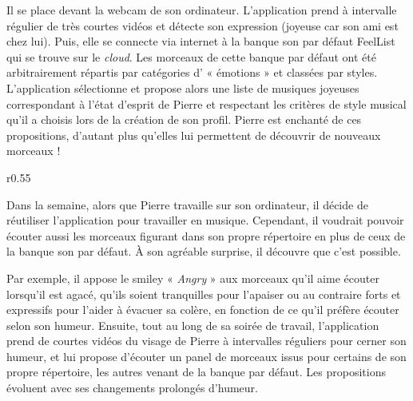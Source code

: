 Il se place devant la webcam de son ordinateur.
L’application prend à intervalle régulier de très courtes vidéos et détecte son expression (joyeuse car son ami est chez lui).
Puis, elle se connecte via internet à la banque son par défaut FeelList qui se trouve sur le \textit{cloud}.
Les morceaux de cette banque par défaut ont été arbitrairement répartis par catégories d' « émotions »  et classées par styles.
L'application sélectionne et propose alors une liste de musiques joyeuses correspondant à l'état d'esprit de Pierre et respectant les critères de style musical qu'il a choisis lors de la création de son profil.
Pierre est enchanté de ces propositions, d'autant plus qu'elles lui permettent de découvrir de nouveaux morceaux !\\

\begin{wrapfigure}{r}{0.55\textwidth}
\end{wrapfigure}

Dans la semaine, alors que Pierre travaille sur son ordinateur, il décide de réutiliser l'application pour travailler en musique.
Cependant, il voudrait pouvoir écouter aussi les morceaux figurant dans son propre répertoire en plus de ceux de la banque son par défaut.
À son agréable surprise, il découvre que c'est possible.

Par exemple, il appose le smiley « \textit{Angry} » aux morceaux qu'il aime écouter lorsqu'il est agacé, qu'ils soient tranquilles pour l'apaiser ou au contraire forts et expressifs pour l'aider à évacuer sa colère, en fonction de ce qu'il préfère écouter selon son humeur.
Ensuite, tout au long de sa soirée de travail, l'application prend de courtes vidéos du visage de Pierre à intervalles réguliers pour cerner son humeur, et lui propose d'écouter un panel de morceaux issus pour certains de son propre répertoire, les autres venant de la banque par défaut.
Les propositions évoluent avec ses changements prolongés d'humeur.

